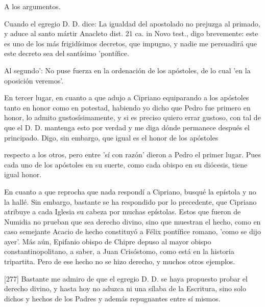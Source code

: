 A los argumentos.

Cuando el egregio D. D. dice: La igualdad del apostolado no prejuzga al primado, y aduce al santo mártir Anacleto dist. 21 ca. in Novo test., digo brevemente: este es uno de los más frigidísimos decretos, que impugno, y nadie me persuadirá que este decreto sea del santísimo 'pontífice.

Al segundo': No puse fuerza en la ordenación de los apóstoles, de lo cual 'en la oposición veremos'.

En tercer lugar, en cuanto a que adujo a Cipriano equiparando a los apóstoles tanto en honor como en potestad, habiendo yo dicho que Pedro fue primero en honor, lo admito gustosísimamente, y si es preciso quiero errar gustoso, con tal de que el D. D. mantenga esto por verdad y me diga dónde permanece después el principado. Digo, sin embargo, que igual es el honor de los apóstoles

respecto a los otros, pero entre 'sí con razón' dieron a Pedro el primer lugar. Pues cada uno de los apóstoles en su suerte, como cada obispo en su diócesis, tiene igual honor.

En cuanto a que reprocha que nada respondí a Cipriano, busqué la epístola y no la hallé. Sin embargo, bastante se ha respondido por lo precedente, que Cipriano atribuye a cada Iglesia su cabeza por muchas epístolas. Estos que fueron de Numidia no prueban que sea derecho divino, sino que muestran el hecho, como en caso semejante Acacio de hecho constituyó a Félix pontífice romano, 'como se dijo ayer'. Más aún, Epifanio obispo de Chipre depuso al mayor obispo constantinopolitano, a saber, a Juan Crisóstomo, como está en la historia tripartita. Pero de ese hecho no se hizo derecho, y muchos otros ejemplos.

[277] Bastante me admiro de que el egregio D. D. se haya propuesto probar el derecho divino, y hasta hoy no aduzca ni una sílaba de la Escritura, sino solo dichos y hechos de los Padres y además repugnantes entre sí mismos.


